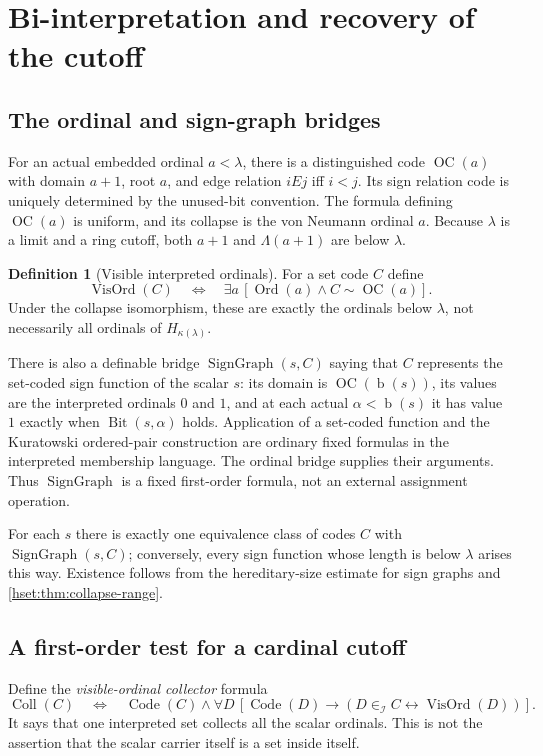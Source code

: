 \documentclass[11pt,letterpaper]{article}
\theoremstyle{definition}
\newtheorem{definition}[definition]{Definition}\aliascntresetthe{definition}
\theoremstyle{remark}
\newcommand{\Ord}{\operatorname{Ord}}
\newcommand{\bd}{\operatorname{b}}
\newcommand{\I}{\mathcal I}
\newcommand{\Code}{\operatorname{Code}}
\newcommand{\Bit}{\operatorname{Bit}}
\newcommand{\Vis}{\operatorname{VisOrd}}
\newcommand{\Coll}{\operatorname{Coll}}
\newcommand{\SG}{\operatorname{SignGraph}}
\newcommand{\OC}{\operatorname{OC}}
\begin{document}
\section{Bi-interpretation and recovery of the cutoff}
\label{hset:sec:biinterpretation}

\subsection{The ordinal and sign-graph bridges}

For an actual embedded ordinal $a<\lambda$, there is a distinguished code
$\OC(a)$ with domain $a+1$, root $a$, and edge relation $iEj$ iff $i<j$.
Its sign relation code is uniquely determined by the unused-bit convention.
The formula defining $\OC(a)$ is uniform, and its collapse is the
von Neumann ordinal $a$. Because $\lambda$ is a limit and a ring cutoff, both
$a+1$ and $\Lambda(a+1)$ are below $\lambda$.

\begin{definition}[Visible interpreted ordinals]
For a set code $C$ define
\[
 \Vis(C)\quad\Longleftrightarrow\quad
 \exists a\,[\Ord(a)\land C\sim\OC(a)].
\]
Under the collapse isomorphism, these are exactly the ordinals below
$\lambda$, not necessarily all ordinals of $H_{\kappa(\lambda)}$.
\end{definition}

There is also a definable bridge $\SG(s,C)$ saying that $C$ represents the
set-coded sign function of the scalar $s$: its domain is $\OC(\bd(s))$, its
values are the interpreted ordinals $0$ and $1$, and at each actual
$\alpha<\bd(s)$ it has value $1$ exactly when $\Bit(s,\alpha)$ holds.
Application of a set-coded function and the Kuratowski ordered-pair
construction are ordinary fixed formulas in the interpreted membership
language. The ordinal bridge supplies their arguments. Thus $\SG$ is a
fixed first-order formula, not an external assignment operation.

For each $s$ there is exactly one equivalence class of codes $C$ with
$\SG(s,C)$; conversely, every sign function whose length is below $\lambda$
arises this way. Existence follows from the hereditary-size estimate for
sign graphs and \cref{hset:thm:collapse-range}.

\subsection{A first-order test for a cardinal cutoff}

Define the \emph{visible-ordinal collector} formula
\begin{equation}
 \Coll(C)\quad\Longleftrightarrow\quad
 \Code(C)\land
 \forall D\,[\Code(D)\longrightarrow
       (D\in_\I C\leftrightarrow\Vis(D))].
 \label{hset:eq:collector}
\end{equation}
It says that one interpreted set collects all the scalar ordinals. This is
not the assertion that the scalar carrier itself is a set inside itself.
\end{document}

